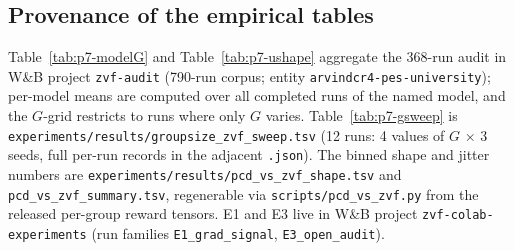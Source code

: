 \documentclass{article}
\begin{document}
\subsection{Provenance of the empirical tables}
\label{sec:p7-appendix-provenance}
Table~\ref{tab:p7-modelG} and Table~\ref{tab:p7-ushape} aggregate the
368-run audit in W\&B project \texttt{zvf-audit} (790-run corpus; entity
\texttt{arvindcr4-pes-university}); per-model means are computed over all
completed runs of the named model, and the $G$-grid restricts to runs where
only $G$ varies. Table~\ref{tab:p7-gsweep} is
\texttt{experiments/results/groupsize\_zvf\_sweep.tsv} (12 runs: 4 values
of $G$ $\times$ 3 seeds, full per-run records in the adjacent
\texttt{.json}). The binned
shape and jitter numbers are
\texttt{experiments/results/pcd\_vs\_zvf\_shape.tsv} and
\texttt{pcd\_vs\_zvf\_summary.tsv}, regenerable via
\texttt{scripts/pcd\_vs\_zvf.py} from the released per-group reward
tensors. E1 and E3 live in W\&B project \texttt{zvf-colab-experiments}
(run families \texttt{E1\_grad\_signal}, \texttt{E3\_open\_audit}).
 

\end{document}
